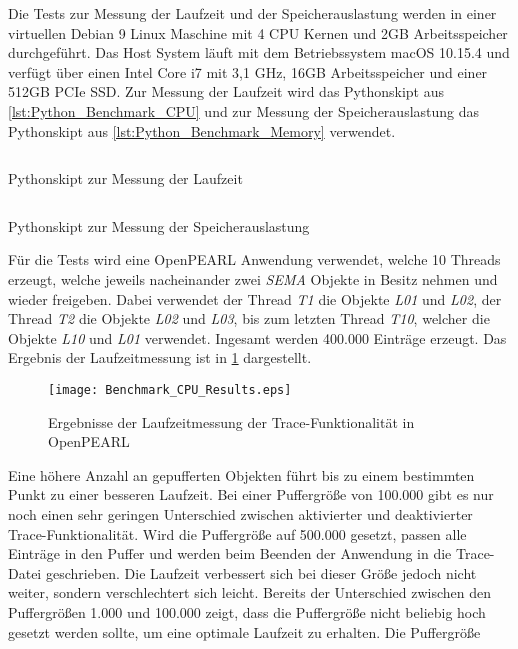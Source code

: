 Die Tests zur Messung der Laufzeit und der Speicherauslastung werden in einer
virtuellen Debian 9 Linux Maschine mit 4 CPU Kernen und 2GB Arbeitsspeicher
durchgeführt. Das Host System läuft mit dem Betriebssystem macOS 10.15.4 und
verfügt über einen Intel Core i7 mit 3,1 GHz, 16GB Arbeitsspeicher und einer
512GB PCIe SSD. Zur Messung der Laufzeit wird das Pythonskipt aus
\cref{lst:Python_Benchmark_CPU} und zur Messung der Speicherauslastung das
Pythonskipt aus \cref{lst:Python_Benchmark_Memory} verwendet.
\begin{listing}[ht]
  \inputminted[frame=lines,linenos]{python}{./Python/benchmark_cpu.py}
  \caption{Pythonskipt zur Messung der Laufzeit}
  \label{lst:Python_Benchmark_CPU}   
\end{listing} 
\begin{listing}[ht]
  \inputminted[frame=lines,linenos]{python}{./Python/benchmark_memory.py}
  \caption{Pythonskipt zur Messung der Speicherauslastung}
  \label{lst:Python_Benchmark_Memory}   
\end{listing}
Für die Tests wird eine OpenPEARL Anwendung verwendet, welche 10 Threads
erzeugt, welche jeweils nacheinander zwei \textit{SEMA} Objekte in Besitz nehmen
und wieder freigeben. Dabei verwendet der Thread \textit{T1} die Objekte
\textit{L01} und \textit{L02}, der Thread \textit{T2} die Objekte \textit{L02}
und \textit{L03}, bis zum letzten Thread \textit{T10}, welcher die Objekte
\textit{L10} und \textit{L01} verwendet. Ingesamt werden 400.000 Einträge
erzeugt. Das Ergebnis der Laufzeitmessung ist in \cref{fig:BenchmarkCpuResults}
dargestellt. 
\begin{figure}[ht]
  \texttt{[image: Benchmark\_CPU\_Results.eps]}
  \caption{Ergebnisse der Laufzeitmessung der Trace-Funktionalität in OpenPEARL}
  \label{fig:BenchmarkCpuResults}
\end{figure}
Eine höhere Anzahl an gepufferten Objekten führt bis zu einem bestimmten Punkt
zu einer besseren Laufzeit. Bei einer Puffergröße von 100.000 gibt es nur noch
einen sehr geringen Unterschied zwischen aktivierter und deaktivierter
Trace-Funktionalität. Wird die Puffergröße auf 500.000 gesetzt, passen alle
Einträge in den Puffer und werden beim Beenden der Anwendung in die Trace-Datei
geschrieben. Die Laufzeit verbessert sich bei dieser Größe jedoch nicht weiter,
sondern verschlechtert sich leicht. Bereits der Unterschied zwischen den
Puffergrößen 1.000 und 100.000 zeigt, dass die Puffergröße nicht beliebig hoch
gesetzt werden sollte, um eine optimale Laufzeit zu erhalten. Die Puffergröße
